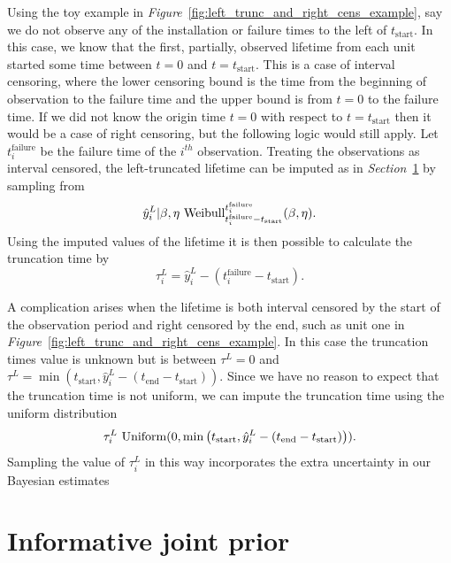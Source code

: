Using the toy example in \textit{Figure}~\ref{fig:left_trunc_and_right_cens_example}, say we do not observe any of the installation or failure times to the left of $t_\text{start}$. In this case, we know that the first, partially, observed lifetime from each unit started some time between $t = 0$ and $t = t_\text{start}$. This is a case of interval censoring, where the lower censoring bound is the time from the beginning of observation to the failure time and the upper bound is from $t = 0$ to the failure time. If we did not know the origin time $t = 0$ with respect to $t = t_\text{start}$ then it would be a case of right censoring, but the following logic would still apply. Let $t^{\text{failure}}_{i}$ be the failure time of the $i^{th}$ observation. Treating the observations as interval censored, the left-truncated lifetime can be imputed as in \textit{Section}~\ref{} by sampling from
\begin{equation}
    \hat{y}^L_i|\beta, \eta ~ \hbox{Weibull}^{t^{\text{failure}}_{i}}_{t^{\text{failure}}_{i} - t_\text{start}}(\beta, \eta).
\end{equation}
Using the imputed values of the lifetime it is then possible to calculate the truncation time by
\begin{equation}
    \tau^L_i = \hat{y}^L_i - \left(t^{\text{failure}}_{i} - t_\text{start}\right).
\end{equation}

A complication arises when the lifetime is both interval censored by the start of the observation period and right censored by the end, such as unit one in \textit{Figure}~\ref{fig:left_trunc_and_right_cens_example}. In this case the truncation times value is unknown but is between $\tau^L = 0$ and $\tau^L = \min\left(t_\text{start}, \hat{y}^L_i - (t_\text{end} - t_\text{start})\right)$. Since we have no reason to expect that the truncation time is not uniform, we can impute the truncation time using the uniform distribution
\begin{equation}
    \tau^L_i ~ \hbox{Uniform}(0, \min\left(t_\text{start}, \hat{y}^L_i - (t_\text{end} - t_\text{start})\right)).
\end{equation}
Sampling the value of $\tau^L_i$ in this way incorporates the extra uncertainty in our Bayesian estimates

\section{Informative joint prior}

